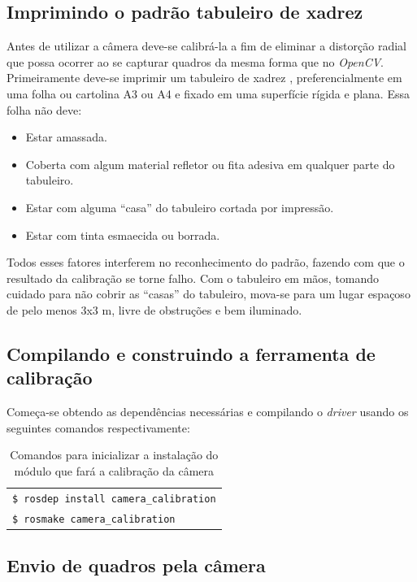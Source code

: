 \subsection{Imprimindo o padrão tabuleiro de xadrez}

Antes de utilizar a câmera deve-se calibrá-la a fim de eliminar a distorção radial que possa ocorrer ao se capturar quadros da mesma forma que no \textit{OpenCV}.
Primeiramente deve-se imprimir um tabuleiro de xadrez \cite{Setup-CalibrateMonocularCamera}, preferencialmente em uma folha ou cartolina A3 ou A4 e fixado em uma superfície rígida e plana. Essa folha não deve: 

\begin{itemize}
	\item{Estar amassada.}
	\item{Coberta com algum material refletor ou fita adesiva em qualquer parte do tabuleiro.}
	\item{Estar com alguma “casa” do tabuleiro cortada por impressão.}
	\item{Estar com tinta esmaecida ou borrada.}
\end{itemize}	

Todos esses fatores interferem no reconhecimento do padrão, fazendo com que o resultado da calibração se torne falho. Com o tabuleiro em mãos, tomando cuidado para não cobrir as “casas” do tabuleiro, mova-se para um lugar espaçoso de pelo menos 3x3 m, livre de obstruções e bem iluminado.

\subsection{Compilando e construindo a ferramenta de calibração}

Começa-se obtendo as dependências necessárias e compilando o \textit{driver} usando os seguintes comandos respectivamente:

\begin{table}[H]\label{tb:1}
\begin{tabular}{| p{\textwidth}|}
\hline
\texttt{\$ rosdep install camera\_calibration} \\
\texttt{\$ rosmake camera\_calibration} \\ \hline
\end{tabular}
\caption{Comandos para inicializar a instalação do módulo que fará a calibração da câmera}
\end{table}


\subsection{Envio de quadros pela câmera}

